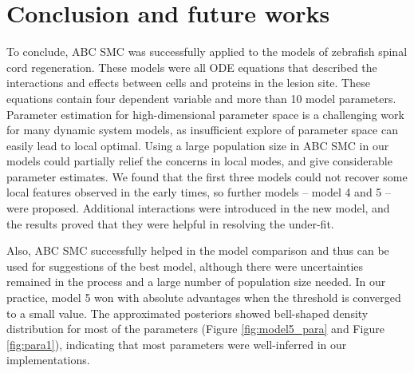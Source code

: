 \chapter{Conclusion and future works}




 To conclude, ABC SMC was successfully applied to the models of zebrafish spinal cord regeneration. These models were all ODE equations that described the interactions and effects between cells and proteins in the lesion site. These equations contain four dependent variable and more than 10 model parameters.  Parameter estimation for high-dimensional parameter space is a challenging work for many dynamic system models, as insufficient explore of parameter space can easily lead to local optimal. Using a large population size in ABC SMC in our models could partially relief the concerns in local modes, and give considerable parameter estimates. We found that the first three models could not recover some local features observed in the early times, so further models -- model 4 and 5 -- were proposed. Additional interactions were introduced in the new model, and the results proved that they were helpful in resolving the under-fit.
 
 Also, ABC SMC successfully helped in the model comparison and thus can be used for suggestions of the best model, although there were uncertainties remained in the process and a large number of population size needed. In our practice, model 5 won with absolute advantages when the threshold is converged to a small value. The approximated posteriors showed bell-shaped density distribution for most of the parameters (Figure \ref{fig:model5_para} and Figure \ref{fig:para1}), indicating that most parameters were well-inferred in our implementations.



